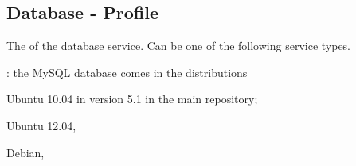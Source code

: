 \label{sec:database_profile}
\subsection{Database - Profile}


The  of the database service. Can be one of the following 
service types.
\begin{asparaitem}
%
\item[\qcode{mysql}:] 
the MySQL database comes in the distributions 
\begin{compactitem}
\item[\TheDistribution{ubuntu}] Ubuntu 10.04 in version 5.1 in the main repository;
\item[\TheDistribution{ubuntu}] Ubuntu 12.04,
\item[\TheDistribution{debian}] Debian,
\end{compactitem}
%
\end{asparaitem}

